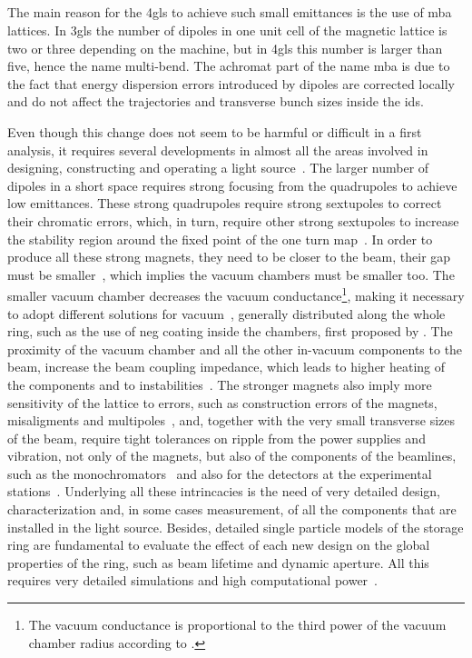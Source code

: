\subsection{}

    The main reason for the \gls{4gls} to achieve such small emittances is the use of \gls{mba} lattices. In \gls{3gls} the number of dipoles in one unit cell of the magnetic lattice is two or three depending on the machine, but in \gls{4gls} this number is larger than five, hence the name multi-bend. The achromat part of the name \gls{mba} is due to the fact that energy dispersion errors introduced by dipoles are corrected locally and do not affect the trajectories and transverse bunch sizes inside the \gls{ids}.

    Even though this change does not seem to be harmful or difficult in a first analysis, it requires several developments in almost all the areas involved in designing, constructing and operating a light source~\cite{Eriksson2014,Liu2017}. The larger number of dipoles in a short space requires strong focusing from the quadrupoles to achieve low emittances. These strong quadrupoles require strong sextupoles to correct their chromatic errors, which, in turn, require other strong sextupoles to increase the stability region around the fixed point of the one turn map~\cite{Borland2014}. In order to produce all these strong magnets, they need to be closer to the beam, their gap must be smaller~\cite{Johansson2014}, which implies the vacuum chambers must be smaller too. The smaller vacuum chamber decreases the vacuum conductance\footnote{The vacuum conductance is proportional to the third power of the vacuum chamber radius according to .}, making it necessary to adopt different solutions for vacuum~\cite{Al-Dmour2014}, generally distributed along the whole ring, such as the use of \gls{neg} coating inside the chambers, first proposed by . The proximity of the vacuum chamber and all the other in-vacuum components to the beam, increase the beam coupling impedance, which leads to higher heating of the components and to instabilities~\cite{Nagaoka2014}. The stronger magnets also imply more sensitivity of the lattice to errors, such as construction errors of the magnets, misaligments and multipoles~\cite{Neuenschwander2015,Hettel2014}, and, together with the very small transverse sizes of the beam, require tight tolerances on ripple from the power supplies and vibration, not only of the magnets, but also of the components of the beamlines, such as the monochromators~\cite{Susini2014,Siewert2014} and also for the detectors at the experimental stations~\cite{Denes2014}. Underlying all these intrincacies is the need of very detailed design, characterization and, in some cases measurement, of all the components that are installed in the light source. Besides, detailed single particle models of the storage ring are fundamental to evaluate the effect of each new design on the global properties of the ring, such as beam lifetime and dynamic aperture. All this requires very detailed simulations and high computational power~\cite{Borland2014}.

